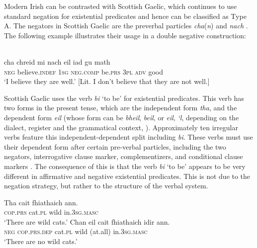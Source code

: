 ﻿\documentclass[output=paper]{langsci/langscibook}
\begin{document}
Modern Irish can be contrasted with Scottish
Gaelic, which continues to use standard negation for
existential predicates and hence can be classified as Type A. The negators
in Scottish Gaelic are the preverbal particles \textit{cha}(\textit{n}) and \textit{nach} \citep[61]{Lamb2001}. The following example illustrates their usage in a double negative construction:
%
\begin{exe}\ex
{}\\
    \gll cha  chreid mi nach eil iad gu    math \\
\textsc{neg} believe.\textsc{indef} \textsc{1sg} \textsc{neg}.\textsc{comp} be.\textsc{prs} \textsc{3pl} \textsc{adv} good \\
    \glt `I believe they are well.' [Lit. I don’t believe that they are not well.] 
    \end{exe}
%
Scottish Gaelic uses the verb \textit{bi} `to be' for existential
predicates. This verb has two forms in the present tense, which are the
independent form \textit{tha}, and the dependent form \textit{eil} (whose
form can be \textit{bheil}, \textit{beil}, or \textit{eil}, \textit{‘l},
depending on the dialect, register and the grammatical context,
\citealt[54]{Lamb2001}). Approximately ten irregular verbs feature this independent-dependent split including \textit{bi}.  These verbs must use their dependent form after certain pre-verbal particles, including the two negators, interrogative clause marker, complementizers, and conditional clause markers \citep[50]{Lamb2001}. The consequence of this is that the verb \textit{bi} `to be' appears to be very different in affirmative and negative existential predicates. This is not due to the negation strategy, but rather to the structure of the verbal system.
%
\begin{exe}\ex
{}
\begin{xlist}
\ex\gll Tha cait fhiathaich ann. \\
\textsc{cop}.\textsc{prs} cat.\textsc{pl} wild in.\textsc{3sg.masc} \\
    \glt `There are wild cats.'
\ex\gll Chan eil cait fhiathaich \op{}idir\cp{}   ann.\\
    \textsc{neg} \textsc{cop.prs.dep} cat.\textsc{pl} wild (at.all)
    in.\textsc{3sg.masc}\\
    \glt `There are no wild cats.'
\end{xlist}\end{exe}
\end{document}
